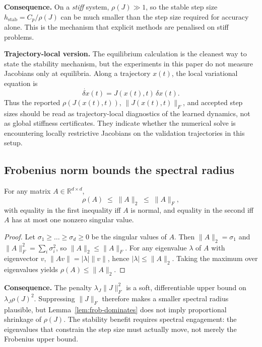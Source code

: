 \textbf{Consequence.} On a \emph{stiff} system, $\rho(J) \gg 1$, so the stable step
size $h_\text{stab} = C_p / \rho(J)$ can be much smaller than the step size required
for accuracy alone. This is the mechanism that explicit methods are penalised on
stiff problems.

\textbf{Trajectory-local version.} The equilibrium calculation is the cleanest
way to state the stability mechanism, but the experiments in this paper do not
measure Jacobians only at equilibria. Along a trajectory $x(t)$, the local
variational equation is
\begin{equation}
\dot{\delta x}(t) = J(x(t),t)\,\delta x(t).
\label{eq:trajectory-linearization}
\end{equation}
Thus the reported $\rho(J(x(t),t))$, $\|J(x(t),t)\|_F$, and accepted step sizes
should be read as trajectory-local diagnostics of the learned dynamics, not as
global stiffness certificates. They indicate whether the numerical solve is
encountering locally restrictive Jacobians on the validation trajectories in
this setup.

\subsection{Frobenius norm bounds the spectral radius}
\label{app:frobenius-bound}

\begin{lemma}
\label{lem:frob-dominates}
For any matrix $A \in \mathbb{R}^{d \times d}$,
\begin{equation}
\rho(A) \;\leq\; \|A\|_2 \;\leq\; \|A\|_F,
\label{eq:frob-bound}
\end{equation}
with equality in the first inequality iff $A$ is normal, and equality in the second
iff $A$ has at most one nonzero singular value.
\end{lemma}

\begin{proof}
Let $\sigma_1 \geq \dots \geq \sigma_d \geq 0$ be the singular values of $A$. Then
$\|A\|_2 = \sigma_1$ and $\|A\|_F^2 = \sum_i \sigma_i^2$, so
$\|A\|_2 \leq \|A\|_F$. For any eigenvalue $\lambda$ of $A$ with eigenvector $v$,
$\|Av\| = |\lambda| \|v\|$, hence $|\lambda| \leq \|A\|_2$. Taking the maximum over
eigenvalues yields $\rho(A) \leq \|A\|_2$.
\end{proof}

\textbf{Consequence.} The penalty $\lambda_J \|J\|_F^2$ is a soft, differentiable
upper bound on $\lambda_J \rho(J)^2$. Suppressing $\|J\|_F$ therefore makes a
smaller spectral radius plausible, but Lemma~\ref{lem:frob-dominates} does not
imply proportional shrinkage of $\rho(J)$. The stability benefit requires
spectral engagement: the eigenvalues that constrain the step size must actually
move, not merely the Frobenius upper bound.

